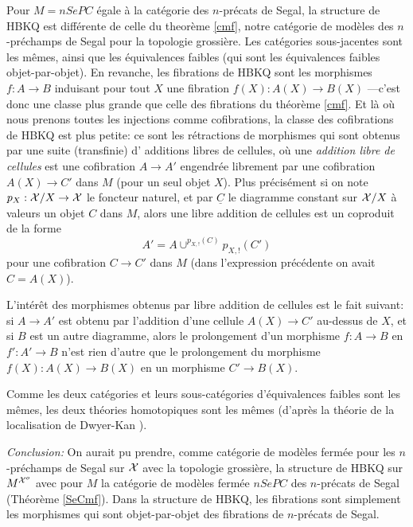 \documentclass[12pt]{article}
\newcommand{\Xx}{{\cal X}}
\begin{document}
Pour $M=nSePC$
\'egale \`a la cat\'egorie des $n$-pr\'ecats de Segal, la structure de HBKQ est
diff\'erente de celle du theor\`eme \ref{cmf}, notre
cat\'egorie de mod\`eles des $n$-pr\'echamps de Segal
pour la topologie grossi\`ere. Les
cat\'egories sous-jacentes sont les m\^emes, ainsi que les \'equivalences
faibles (qui sont les \'equivalences faibles objet-par-objet).
En revanche, les
fibrations de HBKQ sont les morphismes $f:A\rightarrow B$
induisant pour tout $X$ une
fibration $f(X): A(X)\rightarrow B(X)$ ---c'est donc une classe plus
grande que celle des fibrations du th\'eor\`eme \ref{cmf}.
Et l\`a o\`u nous
prenons toutes les injections comme cofibrations, la classe des cofibrations
de HBKQ est plus petite: ce sont les r\'etractions de
morphismes qui
sont obtenus  par une suite (transfinie) d'
additions libres de cellules, o\`u une {\em addition libre de cellules} est une
cofibration  $A\rightarrow A'$ engendr\'ee librement par une cofibration
$A(X)\rightarrow C'$ dans $M$ (pour un seul objet $X$). Plus pr\'ecis\'ement si
on note $p_X: \Xx /X\rightarrow \Xx$ le foncteur naturel, et par $\underline{C}$
le diagramme constant sur $\Xx /X$ \`a valeurs un objet $C$ dans $M$, alors une
libre addition de cellules est un coproduit de la forme
$$
A' = A \cup ^{p_{X,!}(C)}p_{X,!}(C')
$$
pour une cofibration $C\rightarrow C'$ dans $M$ (dans l'expression
pr\'ec\'edente
on avait $C=A(X)$).

L'int\'er\^et des morphismes obtenus par libre addition de cellules est le fait
suivant: si $A\rightarrow A'$ est obtenu par l'addition d'une cellule
$A(X)\rightarrow C'$ au-dessus de $X$, et si  $B$ est un autre diagramme,
alors le prolongement d'un morphisme $f:A\rightarrow B$ en $f':A'\rightarrow B$
n'est rien d'autre que le prolongement du morphisme
$f(X): A(X)\rightarrow B(X)$ en un morphisme $C'\rightarrow B(X)$.

Comme les deux cat\'egories et leurs sous-cat\'egories d'\'equivalences faibles
sont les m\^emes, les deux th\'eories homotopiques sont les m\^emes (d'apr\`es
la th\'eorie de la localisation de Dwyer-Kan
\cite{DwyerKan1} \cite{DwyerKan2} \cite{DwyerKan3}).

{\em Conclusion:} On aurait pu prendre, comme cat\'egorie de mod\`eles ferm\'ee
pour les $n$-pr\'echamps de Segal sur $\Xx$ avec la topologie grossi\`ere, la
structure de HBKQ sur $M^{\Xx ^o}$ avec pour $M$ la cat\'egorie de
mod\`eles ferm\'ee $nSePC$ des $n$-pr\'ecats de Segal (Th\'eor\`eme
\ref{SeCmf}).
Dans la structure de HBKQ, les fibrations sont simplement les morphismes
qui sont objet-par-objet des fibrations de $n$-pr\'ecats de Segal.
\end{document}
